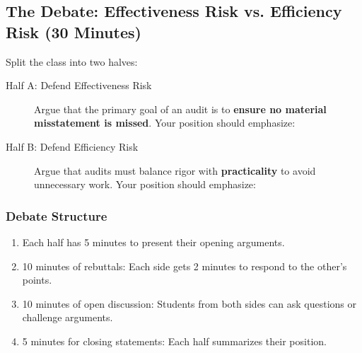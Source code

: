 \documentclass[11pt,a4paper,openany]{memoir}
\begin{document}
\subsection*{The Debate: Effectiveness Risk vs. Efficiency Risk (30 Minutes)}
Split the class into two halves:
\begin{description}
    \item[Half A: Defend Effectiveness Risk] Argue that the primary goal of an audit is to \textbf{ensure no material misstatement is missed}. Your position should emphasize:

    \item[Half B: Defend Efficiency Risk] Argue that audits must balance rigor with \textbf{practicality} to avoid unnecessary work. Your position should emphasize:
\end{description}

\subsubsection*{Debate Structure}
\begin{enumerate}
    \item Each half has 5 minutes to present their opening arguments.
    \item 10 minutes of rebuttals: Each side gets 2 minutes to respond to the other’s points.
    \item 10 minutes of open discussion: Students from both sides can ask questions or challenge arguments.
    \item 5 minutes for closing statements: Each half summarizes their position.
\end{enumerate}
\end{document}
